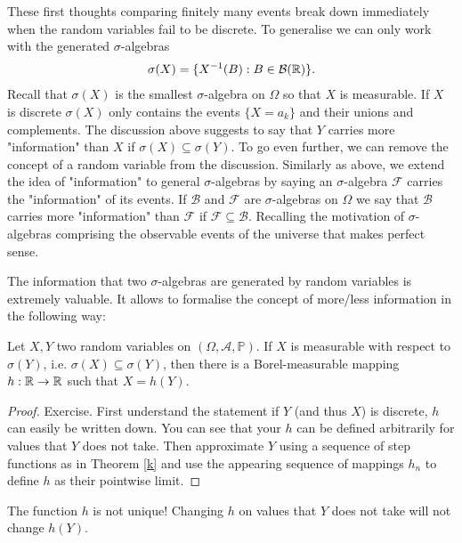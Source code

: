 	These first thoughts comparing finitely many events break down immediately when the random variables fail to be discrete. To generalise we can only work with the generated $\sigma$-algebras
	\begin{align*}
		\sigma(X)=\{ X^{-1}(B): B\in \mathcal B(\mathbb{R})\}.
	\end{align*}
	Recall that $\sigma(X)$ is the smallest $\sigma$-algebra on $\Omega$ so that $X$ is measurable. If $X$ is discrete $\sigma(X)$ only contains the events $\{X=a_k\}$ and their unions and complements. The discussion above suggests to say that $Y$ carries more "{}information"{} than $X$ if $\sigma(X)\subseteq \sigma (Y)$. To go even further, we can remove the concept of a random variable from the discussion. Similarly as above, we extend the idea of "{}information"{} to general $\sigma$-algebras by saying an $\sigma$-algebra $\mathcal F$ carries the "{}information"{} of its events. If $\mathcal B$ and $\mathcal F$ are $\sigma$-algebras on $\Omega$ we say that $\mathcal B$ carries more "{}information"{} than $\mathcal F$ if $\mathcal F\subseteq \mathcal B$. Recalling the motivation of $\sigma$-algebras comprising the observable events of the universe that makes perfect sense.\smallskip
	
The information that two $\sigma$-algebras are generated by random variables is extremely valuable. It allows to formalise the concept of more/less information in the following way:
\begin{lsatzwichtig}
\begin{lemma}
		Let $X, Y$ two random variables on $(\Omega, \mathcal A, \mathbb P)$. If $X$ is measurable with respect to $\sigma(Y)$, i.e. $\sigma(X)\subseteq \sigma(Y)$, then there is a Borel-measurable mapping $h:\mathbb{R}\to\mathbb{R}$ such that $X=h(Y)$.
	\end{lemma}
\end{lsatzwichtig}
	\begin{proof}[Proof]
		Exercise. First understand the statement if $Y$ (and thus $X$) is discrete, $h$ can easily be written down. You can see that your $h$ can be defined arbitrarily for values that $Y$ does not take. Then approximate $Y$ using a sequence of step functions as in Theorem \ref{k} and use the appearing sequence of mappings $h_n$ to define $h$ as their pointwise limit.
	\end{proof}	
	\begin{lwarnhinweis}
		The function $h$ is not unique! Changing $h$ on values that $Y$ does not take will not change $h(Y)$.
	\end{lwarnhinweis}

